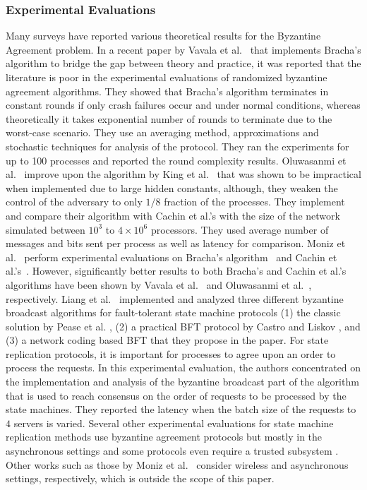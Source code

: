 \subsubsection{Experimental Evaluations} Many surveys have reported various
theoretical results for the Byzantine Agreement problem. In a recent paper by
Vavala et al.~\cite{VN12} that implements Bracha's algorithm \cite{Bracha84} to
bridge the gap between theory and practice, it was reported that the literature
is poor in the experimental evaluations of randomized byzantine agreement algorithms. They
showed that Bracha's algorithm terminates in constant rounds if only crash
failures occur and under normal conditions, whereas theoretically it takes
exponential number of rounds to terminate due to the worst-case scenario. They
use an averaging method, approximations and stochastic techniques for analysis
of the protocol. They ran the experiments for up to 100 processes and reported
the round complexity results. Oluwasanmi et al.~\cite{OSK10} improve
upon the algorithm by King et al.~\cite{KS09} that was shown to be impractical when
implemented due to large hidden constants, although, they weaken the control of
the adversary to only $1/8$ fraction of the processes. They implement and
compare their algorithm with Cachin et al.'s \cite{CKS05} with the size of the
network simulated between $10^3$ to $4\times10^6$ processors. They used average
number of messages and bits sent per process as well as latency for comparison.
Moniz et al.~\cite{MNCV06} perform experimental evaluations on Bracha's
algorithm~\cite{Bracha84} and Cachin et al.'s~\cite{CKS05}. However,
significantly better results to both Bracha's and Cachin et al.'s algorithms
have been shown by Vavala et al.~\cite{VN12} and Oluwasanmi et
al.~\cite{OSK10}, respectively. Liang et al.~\cite{LSV12} implemented and
analyzed three different byzantine broadcast algorithms for fault-tolerant
state machine protocols (1) the classic solution by Pease et al.
\cite{PeaseSL80}, (2) a practical BFT protocol by Castro and Liskov \cite{CL02},
and (3) a network coding based BFT that they propose in the paper. For state
replication protocols, it is important for processes to agree upon an order to
process the requests. In this experimental evaluation, the authors concentrated
on the implementation and analysis of the byzantine broadcast part of the
algorithm that is used to reach consensus on the order of requests to be
processed by the state machines. They reported the latency when the batch size
of the requests to $4$ servers is varied. Several other experimental evaluations for state machine replication methods use byzantine agreement protocols but mostly in the asynchronous settings and some protocols even require a trusted subsystem \cite{AGGRW, CMLRS, VCBL, KBCD, KADCW}. Other works such as those by Moniz et
al.~\cite{MNC10, MNCV11} consider wireless and asynchronous settings,
respectively, which is outside the scope of this paper.

